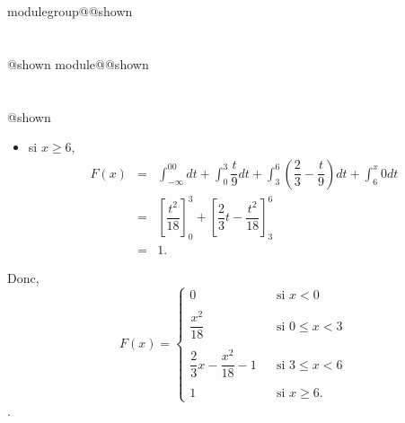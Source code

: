 \documentclass{Evaluation}
\makeatletter
\newcommand{\currentmodulekey}{}
\newcommand{\currentmoduletitle}{}
\newcommand{\currentgroupkey}{}
\newcommand{\currentgrouptitle}{}
\newcommand{\showmoduleifneeded}{%
  \ifx\currentgroupkey\empty\else
    \expandafter\ifx\csname modulegroup@\currentgroupkey @shown\endcsname\relax
      \section*{\currentgrouptitle}%
      \expandafter\gdef\csname modulegroup@\currentgroupkey @shown\endcsname{1}%
    \fi
  \fi
  \expandafter\ifx\csname module@\currentmodulekey @shown\endcsname\relax
    \section*{\currentmoduletitle}%
    \expandafter\gdef\csname module@\currentmodulekey @shown\endcsname{1}%
  \fi
}
\newenvironment{A22}{\showmoduleifneeded}{}
\makeatother
\begin{document}
\begin{questions}
\begin{A22}
\begin{parts}
\begin{solution}
\begin{itemize}
      \item[$\bullet$]  si $x \geq 6,$ \begin{eqnarray*}
                                      F(x)      &=&  \int_{-\infty}^00dt + \int_0^3 \dfrac{t}{9}dt + \int_3^6\left(\dfrac{2}{3}-\dfrac{t}{9}\right)dt +\int_6^x0dt\\
                                                &=&  \left[\dfrac{t^2}{18}\right]_0^3 + \left[\dfrac{2}{3}t -\dfrac{t^2}{18}\right]_3^6\\
                                                &=& 1 .
                                   \end{eqnarray*}
    \end{itemize}
   Donc, $$F(x) = \left \{
                \begin{array}{lcl}
                        0                                   & &\text{si } x < 0 \\
                                                            & & \\
                        \dfrac{x^2}{18}                     & &\text{si } 0 \leq x < 3   \\
                                                            & & \\
                        \dfrac{2}{3}x-\dfrac{x^2}{18}-1     & &\text{si } 3 \leq x < 6 \\
                                                            & & \\
                        1                                   & &\text{si } x \geq 6.
                \end{array}
                    \right.$$.
\end{solution}




\end{parts}
\end{A22}
\end{questions}
\end{document}
